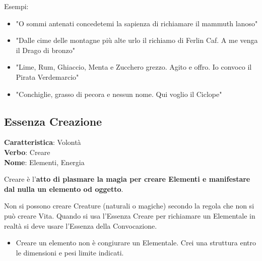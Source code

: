\documentclass[a4paper,11pt,twoside,openany]{book}
\begin{document}
\bigskip

Esempi:
\begin{itemize}
	\item
	      "O sommi antenati concedetemi la sapienza di richiamare il mammuth lanoso"
	\item
	      "Dalle cime delle montagne più alte urlo il richiamo di Ferlin Caf. A me venga il Drago di bronzo"
	\item
	      "Lime, Rum, Ghiaccio, Menta e Zucchero grezzo. Agito e offro. Io convoco il Pirata Verdemarcio"
	\item
	      "Conchiglie, grasso di pecora e nessun nome. Qui voglio il Ciclope"
\end{itemize}

\pagebreak

\subsection{Essenza Creazione}

\textbf{Caratteristica}: Volontà\\
\textbf{Verbo}: Creare\\
\textbf{Nome}: Elementi, Energia\\


\label{essenza-creazione---volonta}

Creare è l'\textbf{atto di plasmare la magia per creare Elementi e manifestare dal nulla un elemento od oggetto}.

Non si possono creare Creature (naturali o magiche) secondo la regola che non si può creare Vita. Quando si usa l'Essenza Creare per richiamare un Elementale in realtà si deve usare l'Essenza della Convocazione.

\begin{itemize}
	\item Creare un elemento non è congiurare un Elementale. Crei una struttura entro le dimensioni e pesi limite indicati.
\end{itemize}
\end{document}
